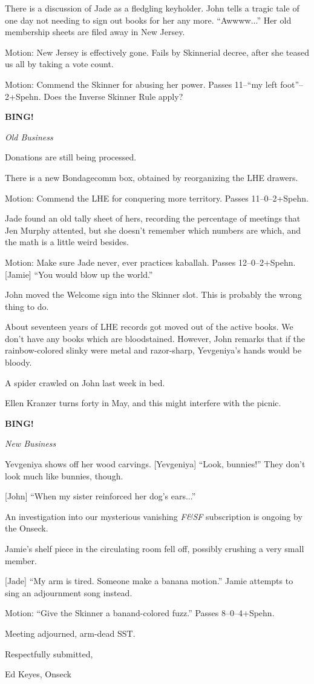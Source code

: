 \documentclass[12pt]{article}
\newcommand{\bing}{{\bf BING!} }
\newcommand{\goto}[1]{\bing \vskip 12pt \centerline{{\em{#1}}}}
\begin{document}
There is a discussion of Jade as a fledgling keyholder.  John tells
a tragic tale of one day not needing to sign out books for her any
more.  ``Awwww...''  Her old membership sheets are filed away in
New Jersey.

Motion: New Jersey is effectively gone.  Fails by Skinnerial decree,
after she teased us all by taking a vote count.

Motion: Commend the Skinner for abusing her power.  Passes
11--``my left foot''--2+Spehn.  Does the Inverse Skinner Rule apply?

\goto{Old Business}

Donations are still being processed.

There is a new Bondagecomm box, obtained by reorganizing the LHE
drawers.

Motion: Commend the LHE for conquering more territory.  Passes
11--0--2+Spehn.

Jade found an old tally sheet of hers, recording the percentage of
meetings that Jen Murphy attented, but she doesn't remember which
numbers are which, and the math is a little weird besides.

Motion: Make sure Jade never, ever practices kaballah.  Passes
12--0--2+Spehn.  [Jamie] ``You would blow up the world.''

John moved the Welcome sign into the Skinner slot.  This is
probably the wrong thing to do.

About seventeen years of LHE records got moved out of the active
books.  We don't have any books which are bloodstained.  However,
John remarks that if the rainbow-colored slinky were metal and
razor-sharp, Yevgeniya's hands would be bloody.

A spider crawled on John last week in bed.

Ellen Kranzer turns forty in May, and this might interfere with
the picnic.

\goto{New Business}

Yevgeniya shows off her wood carvings.  [Yevgeniya] ``Look, bunnies!''
They don't look much like bunnies, though.

[John] ``When my sister reinforced her dog's ears...''

An investigation into our mysterious vanishing {\em F\&SF} subscription
is ongoing by the Onseck.

Jamie's shelf piece in the circulating room fell off, possibly
crushing a very small member.

[Jade] ``My arm is tired.  Someone make a banana motion.''  Jamie
attempts to sing an adjournment song instead.

Motion: ``Give the Skinner a banand-colored fuzz.''  Passes
8--0--4+Spehn.

\vspace{12pt}

\noindent
Meeting adjourned, arm-dead SST.

\vspace{18pt}

\centerline{Respectfully submitted,}
\centerline{Ed Keyes, Onseck}
\end{document}
